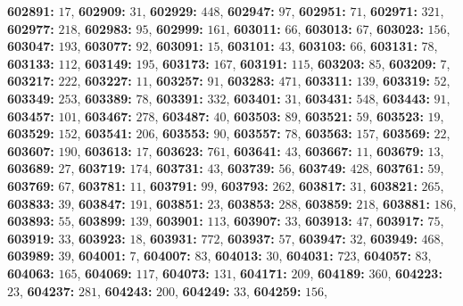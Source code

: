 \textsf{\bfseries 602891:} $17$, \textsf{\bfseries 602909:} $31$, \textsf{\bfseries 602929:} $448$, \textsf{\bfseries 602947:} $97$, \textsf{\bfseries 602951:} $71$, \textsf{\bfseries 602971:} $321$, \textsf{\bfseries 602977:} $218$, \textsf{\bfseries 602983:} $95$, \textsf{\bfseries 602999:} $161$, \textsf{\bfseries 603011:} $66$, \textsf{\bfseries 603013:} $67$, \textsf{\bfseries 603023:} $156$, \textsf{\bfseries 603047:} $193$, \textsf{\bfseries 603077:} $92$, \textsf{\bfseries 603091:} $15$, \textsf{\bfseries 603101:} $43$, \textsf{\bfseries 603103:} $66$, \textsf{\bfseries 603131:} $78$, \textsf{\bfseries 603133:} $112$, \textsf{\bfseries 603149:} $195$, \textsf{\bfseries 603173:} $167$, \textsf{\bfseries 603191:} $115$, \textsf{\bfseries 603203:} $85$, \textsf{\bfseries 603209:} $7$, \textsf{\bfseries 603217:} $222$, \textsf{\bfseries 603227:} $11$, \textsf{\bfseries 603257:} $91$, \textsf{\bfseries 603283:} $471$, \textsf{\bfseries 603311:} $139$, \textsf{\bfseries 603319:} $52$, \textsf{\bfseries 603349:} $253$, \textsf{\bfseries 603389:} $78$, \textsf{\bfseries 603391:} $332$, \textsf{\bfseries 603401:} $31$, \textsf{\bfseries 603431:} $548$, \textsf{\bfseries 603443:} $91$, \textsf{\bfseries 603457:} $101$, \textsf{\bfseries 603467:} $278$, \textsf{\bfseries 603487:} $40$, \textsf{\bfseries 603503:} $89$, \textsf{\bfseries 603521:} $59$, \textsf{\bfseries 603523:} $19$, \textsf{\bfseries 603529:} $152$, \textsf{\bfseries 603541:} $206$, \textsf{\bfseries 603553:} $90$, \textsf{\bfseries 603557:} $78$, \textsf{\bfseries 603563:} $157$, \textsf{\bfseries 603569:} $22$, \textsf{\bfseries 603607:} $190$, \textsf{\bfseries 603613:} $17$, \textsf{\bfseries 603623:} $761$, \textsf{\bfseries 603641:} $43$, \textsf{\bfseries 603667:} $11$, \textsf{\bfseries 603679:} $13$, \textsf{\bfseries 603689:} $27$, \textsf{\bfseries 603719:} $174$, \textsf{\bfseries 603731:} $43$, \textsf{\bfseries 603739:} $56$, \textsf{\bfseries 603749:} $428$, \textsf{\bfseries 603761:} $59$, \textsf{\bfseries 603769:} $67$, \textsf{\bfseries 603781:} $11$, \textsf{\bfseries 603791:} $99$, \textsf{\bfseries 603793:} $262$, \textsf{\bfseries 603817:} $31$, \textsf{\bfseries 603821:} $265$, \textsf{\bfseries 603833:} $39$, \textsf{\bfseries 603847:} $191$, \textsf{\bfseries 603851:} $23$, \textsf{\bfseries 603853:} $288$, \textsf{\bfseries 603859:} $218$, \textsf{\bfseries 603881:} $186$, \textsf{\bfseries 603893:} $55$, \textsf{\bfseries 603899:} $139$, \textsf{\bfseries 603901:} $113$, \textsf{\bfseries 603907:} $33$, \textsf{\bfseries 603913:} $47$, \textsf{\bfseries 603917:} $75$, \textsf{\bfseries 603919:} $33$, \textsf{\bfseries 603923:} $18$, \textsf{\bfseries 603931:} $772$, \textsf{\bfseries 603937:} $57$, \textsf{\bfseries 603947:} $32$, \textsf{\bfseries 603949:} $468$, \textsf{\bfseries 603989:} $39$, \textsf{\bfseries 604001:} $7$, \textsf{\bfseries 604007:} $83$, \textsf{\bfseries 604013:} $30$, \textsf{\bfseries 604031:} $723$, \textsf{\bfseries 604057:} $83$, \textsf{\bfseries 604063:} $165$, \textsf{\bfseries 604069:} $117$, \textsf{\bfseries 604073:} $131$, \textsf{\bfseries 604171:} $209$, \textsf{\bfseries 604189:} $360$, \textsf{\bfseries 604223:} $23$, \textsf{\bfseries 604237:} $281$, \textsf{\bfseries 604243:} $200$, \textsf{\bfseries 604249:} $33$, \textsf{\bfseries 604259:} $156$, 
